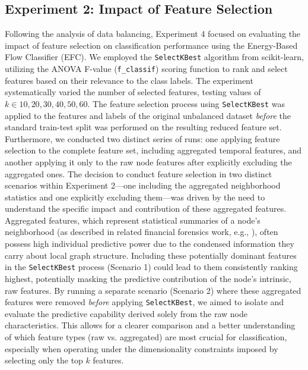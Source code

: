 \documentclass[12pt]{article}
\begin{document}
\subsection{Experiment 2: Impact of Feature Selection} \label{subsec:experiment_2}
Following the analysis of data balancing, Experiment 4 focused on evaluating 
the impact of feature selection on classification performance using the Energy-Based Flow Classifier (EFC). We employed
the \texttt{SelectKBest} algorithm from scikit-learn, utilizing the ANOVA F-value (\texttt{f\_classif}) scoring function
to rank and select features based on their relevance to the class labels. The experiment systematically varied the number
of selected features, testing values of $k \in {10, 20, 30, 40, 50, 60}$. The feature selection process using \texttt{SelectKBest}
was applied to the features and labels of the original unbalanced dataset \textit{before} the standard train-test split
was performed on the resulting reduced feature set. Furthermore, we conducted two distinct series of runs: one applying
feature selection to the complete feature set, including aggregated temporal features, and another applying it only to
the raw node features after explicitly excluding the aggregated ones. The decision to conduct feature selection in two
distinct scenarios within Experiment 2---one including the aggregated neighborhood statistics and one explicitly excluding
them---was driven by the need to understand the specific impact and contribution of these aggregated features. Aggregated
features, which represent statistical summaries of a node's neighborhood (as described in related financial forensics
work, e.g., \cite{weber2019antimoneylaunderingbitcoinexperimenting}), often possess high individual predictive power due
to the condensed information they carry about local graph structure. Including these potentially dominant features in the
\texttt{SelectKBest} process (Scenario 1) could lead to them consistently ranking highest, potentially masking the predictive
contribution of the node's intrinsic, raw features. By running a separate scenario (Scenario 2) where these aggregated
features were removed \textit{before} applying \texttt{SelectKBest}, we aimed to isolate and evaluate the predictive
capability derived solely from the raw node characteristics. This allows for a clearer comparison and a better understanding
of which feature types (raw vs. aggregated) are most crucial for classification, especially when operating under the
dimensionality constraints imposed by selecting only the top $k$ features.
\end{document}
